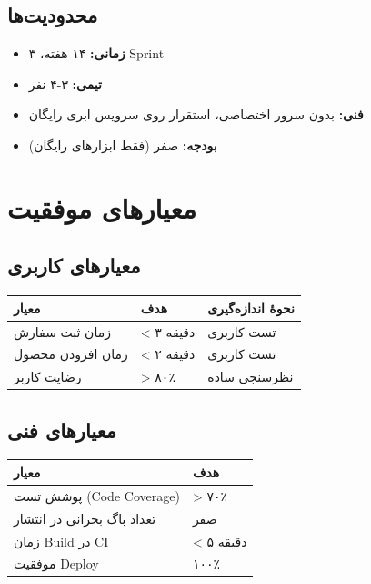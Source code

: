 \documentclass[12pt, a4paper]{article}
\begin{document}
\subsection{محدودیت‌ها}
\begin{itemize}
    \item \textbf{زمانی:} ۱۴ هفته، ۳ Sprint
    \item \textbf{تیمی:} ۳-۴ نفر
    \item \textbf{فنی:} بدون سرور اختصاصی، استقرار روی سرویس ابری رایگان
    \item \textbf{بودجه:} صفر (فقط ابزارهای رایگان)
\end{itemize}

\section{معیارهای موفقیت}

\subsection{معیارهای کاربری}
\begin{center}
\begin{tabular}{|l|l|l|}
\hline
\textbf{معیار} & \textbf{هدف} & \textbf{نحوهٔ اندازه‌گیری} \\
\hline
زمان ثبت سفارش & < ۳ دقیقه & تست کاربری \\
\hline
زمان افزودن محصول & < ۲ دقیقه & تست کاربری \\
\hline
رضایت کاربر & > ۸۰٪ & نظرسنجی ساده \\
\hline
\end{tabular}
\end{center}

\subsection{معیارهای فنی}
\begin{center}
\begin{tabular}{|l|l|}
\hline
\textbf{معیار} & \textbf{هدف} \\
\hline
پوشش تست (Code Coverage) & > ۷۰٪ \\
\hline
تعداد باگ بحرانی در انتشار & صفر \\
\hline
زمان Build در CI & < ۵ دقیقه \\
\hline
موفقیت Deploy & ۱۰۰٪ \\
\hline
\end{tabular}
\end{center}
\end{document}
